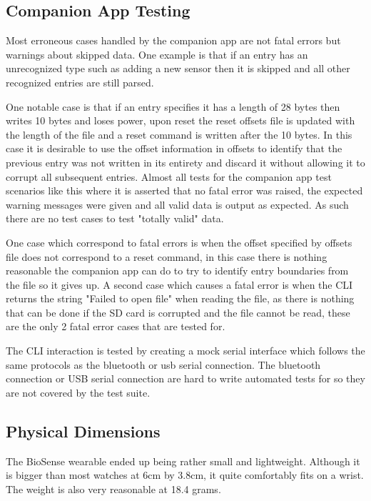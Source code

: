 \subsection{Companion App Testing}

Most erroneous cases handled by the companion app are not fatal errors but warnings about skipped data. One example is that if an entry has an unrecognized type such as adding a new sensor then it is skipped and all other recognized entries are still parsed.

One notable case is that if an entry specifies it has a length of 28 bytes then
writes 10 bytes and loses power, upon reset the reset offsets file is updated with 
the length of the file and a reset command is written after the 10 bytes.  
In this case it is desirable to use the offset information in offsets to 
identify that the previous entry was not written in its entirety and discard it without allowing it to corrupt all subsequent entries.  Almost all tests for the companion app test scenarios like this where it is asserted that no fatal error was raised, the expected warning messages were given and all valid data is output as expected. As such there are no test cases to test "totally valid" data.

One case which correspond to fatal errors is when the offset specified by offsets file does not correspond to a reset command, in this case there is nothing reasonable the companion app can do to try to identify entry boundaries from the file so it gives up.  A second case which causes a fatal error is when the CLI returns the string "Failed to open file" when reading the file, as there is nothing that can be done if the SD card is corrupted and the file cannot be read, these are the only 2 fatal error cases that are tested for.

The CLI interaction is tested by creating a mock serial interface which follows the same protocols as the bluetooth or usb serial connection.  The bluetooth connection or USB serial connection are hard to write automated tests for so they are not covered by the test suite.

\subsection{Physical Dimensions}

The BioSense wearable ended up being rather small and lightweight. Although it
is bigger than most watches at 6cm by 3.8cm, it quite comfortably fits on a
wrist. The weight is also very reasonable at 18.4 grams.

